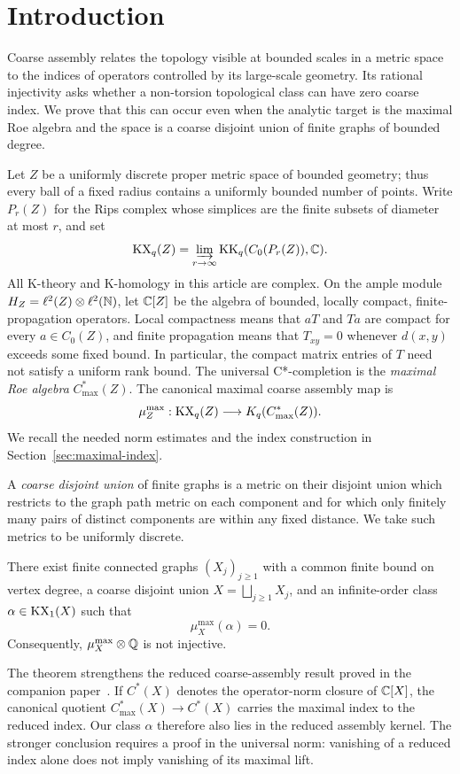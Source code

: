 \section{Introduction}\label{sec:introduction}

Coarse assembly relates the topology visible at bounded scales in a metric
space to the indices of operators controlled by its large-scale geometry.
Its rational injectivity asks whether a non-torsion topological class can
have zero coarse index. We prove that this can occur even when the analytic
target is the maximal Roe algebra and the space is a coarse disjoint union
of finite graphs of bounded degree.

Let $Z$ be a uniformly discrete proper metric space of bounded geometry;
thus every ball of a fixed radius contains a uniformly bounded number of
points. Write $P_r(Z)$ for the Rips complex whose simplices are the finite
subsets of diameter at most $r$, and set
\[
 \operatorname{KX}_q(Z)=\varinjlim_{r\to\infty}\operatorname{KK}_q(C_0(P_r(Z)),\mathbb C).
\]
All K-theory and K-homology in this article are complex. On the ample module
$H_Z=\ell^2(Z)\otimes\ell^2(\mathbb N)$, let $\mathbb C[Z]$ be the algebra of bounded,
locally compact, finite-propagation operators. Local compactness means that
$aT$ and $Ta$ are compact for every $a\in C_0(Z)$, and finite propagation
means that $T_{xy}=0$ whenever $d(x,y)$ exceeds some fixed bound. In
particular, the compact matrix entries of $T$ need not satisfy a uniform
rank bound. The universal C*-completion is the \emph{maximal Roe algebra}
$C^*_{\max}(Z)$. The canonical maximal coarse assembly map is
\[
 \mu_Z^{\max}:\operatorname{KX}_q(Z)\longrightarrow K_q(C^*_{\max}(Z)).
\]
We recall the needed norm estimates and the index construction in
Section~\ref{sec:maximal-index}.

A \emph{coarse disjoint union} of finite graphs is a metric on their disjoint
union which restricts to the graph path metric on each component and for
which only finitely many pairs of distinct components are within any fixed
distance. We take such metrics to be uniformly discrete.

\begin{theorem}\label{thm:main}
There exist finite connected graphs $(X_j)_{j\geq1}$ with a common finite
bound on vertex degree, a coarse disjoint union $X=\bigsqcup_{j\geq1}X_j$,
and an infinite-order class $\alpha\in\operatorname{KX}_1(X)$ such that
\[
 \mu_X^{\max}(\alpha)=0.
\]
Consequently, $\mu_X^{\max}\otimes\mathbb Q$ is not injective.
\end{theorem}

The theorem strengthens the reduced coarse-assembly result proved in the
companion paper~\cite{OpenAICoarseNovikov2026}.
If $C^*(X)$ denotes the operator-norm
closure of $\mathbb C[X]$, the canonical quotient
$C^*_{\max}(X)\to C^*(X)$ carries the maximal index to the reduced index.
Our class $\alpha$ therefore also lies in the reduced assembly kernel. The stronger
conclusion requires a proof in the universal norm: vanishing of a reduced
index alone does not imply vanishing of its maximal lift.

